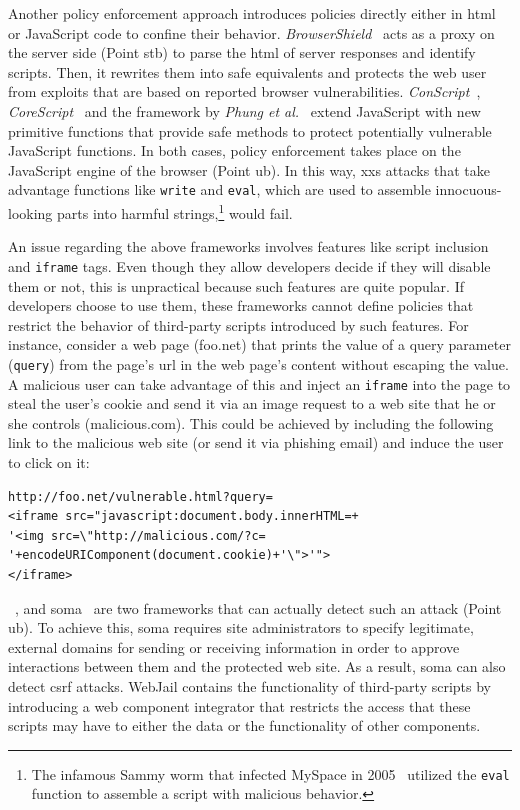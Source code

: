 \documentclass[conference]{IEEEtran}
\begin{document}
Another policy enforcement approach introduces
policies directly either in {\sc html} or JavaScript code
to confine their behavior. {\it BrowserShield}~\cite{RDWDE07}
acts as a proxy on the server side (Point {\sc s}t{\sc b}) to
parse the {\sc html} of server responses and identify
scripts. Then, it rewrites them into safe equivalents
and protects the web user from exploits
that are based on reported browser vulnerabilities.
{\it ConScript}~\cite{ML10}, {\it CoreScript}~\cite{YCIS07}
and the framework by {\it Phung et al.}~\cite{PSC09}
extend JavaScript with new primitive functions that
provide safe methods to protect potentially vulnerable
JavaScript functions. In both cases, policy enforcement takes
place on the JavaScript engine of the browser (Point {\sc ub}).
In this way, {\sc xxs} attacks that take advantage
functions like {\tt write} and {\tt eval}, which are
used to assemble innocuous-looking parts into harmful
strings,\footnote{The infamous Sammy worm that
infected MySpace in 2005~\cite{SP07,ELX07}
utilized the {\tt eval} function to assemble a
script with malicious behavior.} would fail.

An issue regarding the above frameworks
involves features like script inclusion
and {\tt iframe} tags. Even though they allow developers
decide if they will disable them or not,
this is unpractical because such features are quite popular.
If developers choose to use them, these frameworks cannot
define policies that restrict the behavior of third-party
scripts introduced by such features. For instance,
consider a web page (foo.net) that prints the value
of a query parameter ({\tt query}) from the
page's {\sc url} in the web page's content
without escaping the value. A malicious user
can take advantage of this and inject an {\tt iframe}
into the page to steal the user's cookie and
send it via an image request to a web site
that he or she controls (malicious.com).
This could be achieved by including the following
link to the malicious web site (or send it via phishing
email) and induce the user to click on it:

\lstset{language=VBScript, basicstyle=\footnotesize\ttfamily,}
\begin{lstlisting}
http://foo.net/vulnerable.html?query=
<iframe src="javascript:document.body.innerHTML=+
'<img src=\"http://malicious.com/?c=
'+encodeURIComponent(document.cookie)+'\">'">
</iframe>
\end{lstlisting}

~\cite{VDDPJ11}, and {\sc soma}~\cite{OWVS08}
are two frameworks that can actually detect such an attack (Point {\sc
  ub}). To achieve this, {\sc soma} requires site administrators to
specify legitimate, external domains for sending or receiving
information in order to approve interactions between them and the
protected web site. As a result, {\sc soma} can also detect {\sc csrf}
attacks. WebJail contains the functionality of third-party scripts by
introducing a web component integrator that restricts the access that
these scripts may have to either the data or the functionality of
other components.
\end{document}
